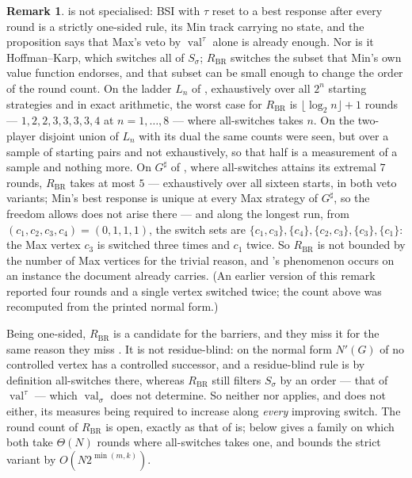 \documentclass[11pt]{article}
\theoremstyle{plain}
\theoremstyle{definition}
\newtheorem{remark}[theorem]{Remark}
\DeclareMathOperator{\val}{val}
\begin{document}
\begin{remark}\label{rem:bsi-br}
 is not  specialised: BSI with
$\tau$ reset to a best response after every round is a strictly one-sided
rule, its Min track carrying no state, and the proposition says that
Max's veto by $\val^\tau$ alone is already enough. Nor is it
Hoffman--Karp, which switches all of $S_\sigma$; $R_{\mathrm{BR}}$
switches the subset that Min's own value function endorses, and that
subset can be small enough to change the order of the round count. On the
ladder $L_n$ of , exhaustively over all $2^{n}$ starting
strategies and in exact arithmetic, the worst case for $R_{\mathrm{BR}}$
is $\lfloor\log_2n\rfloor+1$ rounds --- $1,2,2,3,3,3,3,4$ at
$n=1,\dots,8$ --- where all-switches takes $n$. On the two-player
disjoint union of $L_n$ with its dual the same counts were seen, but over
a sample of starting pairs and not exhaustively, so that half is a
measurement of a sample and nothing more. On $G^{\sharp}$ of
, where all-switches attains its extremal $7$ rounds,
$R_{\mathrm{BR}}$ takes at most $5$ --- exhaustively over all sixteen
starts, in both veto variants; Min's best response is unique at every Max
strategy of $G^{\sharp}$, so the freedom  allows does
not arise there --- and along the longest run, from
$(c_1,c_2,c_3,c_4)=(0,1,1,1)$, the switch sets are
$\{c_1,c_3\},\{c_4\},\{c_2,c_3\},\{c_3\},\{c_1\}$: the Max vertex $c_3$
is switched three times and $c_1$ twice. So $R_{\mathrm{BR}}$ is not
bounded by the number of Max vertices for the trivial reason, and
's phenomenon occurs on an instance the document
already carries. (An earlier version of this remark reported four rounds
and a single vertex switched twice; the count above was recomputed from
the printed normal form.)

Being one-sided, $R_{\mathrm{BR}}$ is a candidate for the barriers, and
they miss it for the same reason they miss . It is not
residue-blind: on the normal form $N'(G)$ of  no
controlled vertex has a controlled successor, and a residue-blind rule is
by definition all-switches there, whereas $R_{\mathrm{BR}}$ still filters
$S_\sigma$ by an order --- that of $\val^\tau$ --- which $\val_\sigma$ does
not determine. So neither  nor
 applies, and  does not
either, its measures being required to increase along \emph{every}
improving switch. The round count of $R_{\mathrm{BR}}$ is open, exactly as
that of  is;  below gives a family on
which both take $\Theta(N)$ rounds where all-switches takes one, and
 bounds the strict variant by $O(N2^{\min(m,k)})$.


\end{remark}
\end{document}
